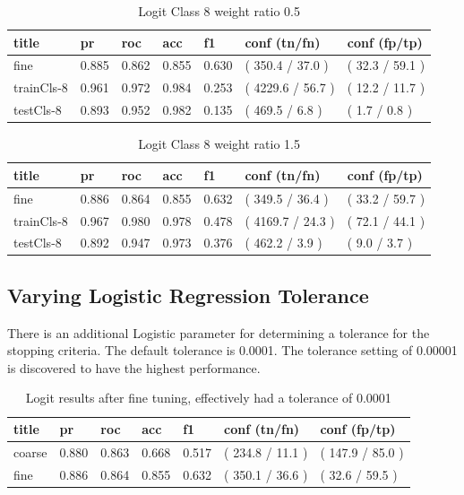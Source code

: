 \documentclass[ms]{nuthesis}
\begin{document}
\FloatBarrier
\begin{table}[H]
\centering
\caption{Logit Class 8 weight ratio 0.5}
\label{tab:LogRegCls8-Wtp5}
\begin{tabular}{|l||l||l||l||l||l||l|}\toprule
title & pr & roc & acc & f1 & conf (tn/fn) & conf (fp/tp) \\ \midrule
fine & 0.885 & 0.862 & 0.855 & 0.630 & ( 350.4 / 37.0 ) & ( 32.3 / 59.1 ) \\
trainCls-8 & 0.961 & 0.972 & 0.984 & 0.253 & ( 4229.6 / 56.7 ) & ( 12.2 / 11.7 ) \\
testCls-8 & 0.893 & 0.952 & 0.982 & 0.135 & ( 469.5 / 6.8 ) & ( 1.7 / 0.8 ) \\ \bottomrule
\end{tabular}
\end{table}
\FloatBarrier

\FloatBarrier
\begin{table}[H]
\centering
\caption{Logit Class 8 weight ratio 1.5}
\label{tab:LogRegCls8-Wt1p5}
\begin{tabular}{|l||l||l||l||l||l||l|}\toprule
title & pr & roc & acc & f1 & conf (tn/fn) & conf (fp/tp) \\ \midrule
fine & 0.886 & 0.864 & 0.855 & 0.632 & ( 349.5 / 36.4 ) & ( 33.2 / 59.7 ) \\
trainCls-8 & 0.967 & 0.980 & 0.978 & 0.478 & ( 4169.7 / 24.3 ) & ( 72.1 / 44.1 ) \\
testCls-8 & 0.892 & 0.947 & 0.973 & 0.376 & ( 462.2 / 3.9 ) & ( 9.0 / 3.7 ) \\ \bottomrule
\end{tabular}
\end{table}
\FloatBarrier

\subsection{Varying Logistic Regression Tolerance}
\par There is an additional Logistic parameter for determining a tolerance for the
stopping criteria. The default tolerance is 0.0001. The tolerance setting of
0.00001 is discovered to have the highest performance.

\FloatBarrier
\begin{table}[H]
\centering
\caption{Logit results after fine tuning, effectively had a tolerance of 0.0001}
\label{tab:LogRegAftFineTune}
\begin{tabular}{|l||l||l||l||l||l||l|}\toprule
title & pr & roc & acc & f1 & conf (tn/fn) & conf (fp/tp) \\ \midrule
coarse & 0.880 & 0.863 & 0.668 & 0.517 & ( 234.8 / 11.1 ) & ( 147.9 / 85.0 ) \\
fine & 0.886 & 0.864 & 0.855 & 0.632 & ( 350.1 / 36.6 ) & ( 32.6 / 59.5 ) \\ \bottomrule
\end{tabular}
\end{table}
\FloatBarrier
\end{document}
